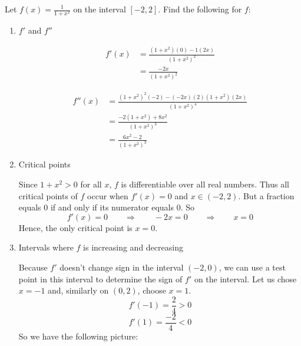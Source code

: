 \documentclass[nooutcomes]{ximera}
\begin{document}
\begin{problem}
Let $f(x) = \frac{1}{1 + x^2}$ on the interval $[-2,2]$.  Find the following for $f$:

	\begin{enumerate}
	
	\item  $f'$ and $f''$
	
		\begin{freeResponse}
			\begin{align*}
			f'(x) &= \frac{(1+x^2)(0) - 1(2x)}{(1+x^2)^2} \\
			&= \frac{-2x}{(1+x^2)^2}
			\end{align*}
			
			\begin{align*}
			f''(x) &= \frac{(1+x^2)^2(-2) - (-2x)(2)(1+x^2)(2x)}{(1+x^2)^4} \\
			&= \frac{-2(1+x^2) + 8x^2}{(1+x^2)^3} \\
			&= \frac{6x^2 - 2}{(1+x^2)^3}
			\end{align*}
		\end{freeResponse}
		
	\item  Critical points
	
		\begin{freeResponse}
		Since $1+x^2 > 0$ for all $x$, $f$ is differentiable over all real numbers.  Thus all critical points of $f$ occur when $f'(x) = 0$ and $x \in (-2,2)$.  But a fraction equals 0 if and only if its numerator equals 0.  So
		$$ f'(x) = 0 \qquad \Longrightarrow \qquad -2x = 0 \qquad \Longrightarrow \qquad x=0 $$
		Hence, the only critical point is $x=0$.  
		\end{freeResponse}
		
	\item  Intervals where $f$ is increasing and decreasing
	
		\begin{freeResponse}
		Because $f'$ doesn’t change sign in the interval $(-2,0)$, we can use a test point in this interval to determine the sign of $f'$ on the interval.  Let us chose $x=-1$ and, similarly on $(0,2)$, choose $x=1$.
		$$ f'(-1) = \frac{2}{4} > 0 $$
		$$ f'(1) = \frac{-2}{4} < 0 $$
		So we have the following picture:
		
		
\begin{center}
\begin{image}
\begin{tikzpicture}


\end{tikzpicture}
\end{image}
\end{center}
\end{freeResponse}
\end{enumerate}
\end{problem}
\end{document}
